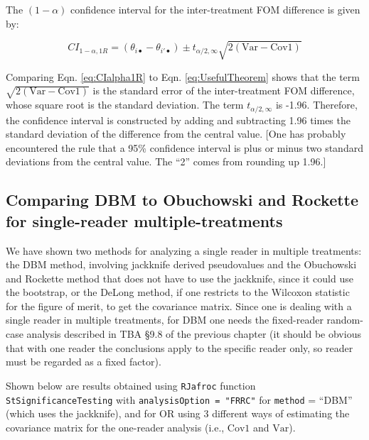 \documentclass[
]{book}
\begin{document}
The \((1-\alpha)\) confidence interval for the inter-treatment FOM difference is given by:

\begin{equation}
CI_{1-\alpha,1R} = (\theta_{i\bullet} - \theta_{i'\bullet}) \pm t_{\alpha/2,\infty} \sqrt{2(\text{Var}-\text{Cov1})}
\label{eq:CIalpha1R}
\end{equation}

Comparing Eqn. \eqref{eq:CIalpha1R} to Eqn. \eqref{eq:UsefulTheorem} shows that the term \(\sqrt{2(\text{Var}-\text{Cov1})}\) is the standard error of the inter-treatment FOM difference, whose square root is the standard deviation. The term \(t_{\alpha/2,\infty}\) is -1.96. Therefore, the confidence interval is constructed by adding and subtracting 1.96 times the standard deviation of the difference from the central value. {[}One has probably encountered the rule that a 95\% confidence interval is plus or minus two standard deviations from the central value. The ``2'' comes from rounding up 1.96.{]}

\hypertarget{ORMethodIntro-CompareDBM2OR41R}{%
\subsection{Comparing DBM to Obuchowski and Rockette for single-reader multiple-treatments}\label{ORMethodIntro-CompareDBM2OR41R}}

We have shown two methods for analyzing a single reader in multiple treatments: the DBM method, involving jackknife derived pseudovalues and the Obuchowski and Rockette method that does not have to use the jackknife, since it could use the bootstrap, or the DeLong method, if one restricts to the Wilcoxon statistic for the figure of merit, to get the covariance matrix. Since one is dealing with a single reader in multiple treatments, for DBM one needs the fixed-reader random-case analysis described in TBA §9.8 of the previous chapter (it should be obvious that with one reader the conclusions apply to the specific reader only, so reader must be regarded as a fixed factor).

Shown below are results obtained using \texttt{RJafroc} function \texttt{StSignificanceTesting} with \texttt{analysisOption\ =\ "FRRC"} for \texttt{method} = ``DBM'' (which uses the jackknife), and for OR using 3 different ways of estimating the covariance matrix for the one-reader analysis (i.e., \(\text{Cov1}\) and \(\text{Var}\)).
\end{document}
